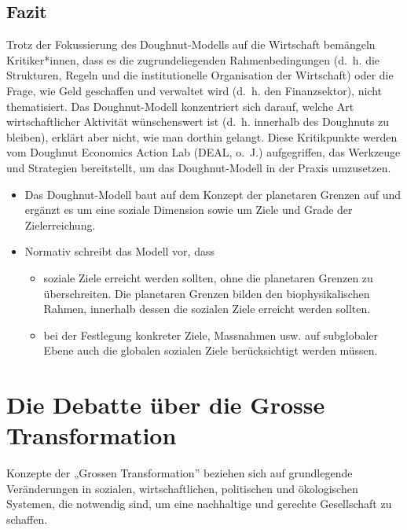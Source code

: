 \documentclass[
  nswissgerman,
  a4paper,
  DIV=11,
  numbers=noendperiod,
  oneside,
  openany]{scrreprt}
\begin{document}
\subsection{Fazit}\label{fazit-1}

Trotz der Fokussierung des Doughnut-Modells auf die Wirtschaft bemängeln
Kritiker*innen, dass es die zugrundeliegenden Rahmenbedingungen (d.~h.
die Strukturen, Regeln und die institutionelle Organisation der
Wirtschaft) oder die Frage, wie Geld geschaffen und verwaltet wird
(d.~h. den Finanzsektor), nicht thematisiert. Das Doughnut-Modell
konzentriert sich darauf, welche Art wirtschaftlicher Aktivität
wünschenswert ist (d.~h. innerhalb des Doughnuts zu bleiben), erklärt
aber nicht, wie man dorthin gelangt. Diese Kritikpunkte werden vom
Doughnut Economics Action Lab (DEAL, o.~J.) aufgegriffen, das Werkzeuge
und Strategien bereitstellt, um das Doughnut-Modell in der Praxis
umzusetzen.

\begin{itemize}
\item
  Das Doughnut-Modell baut auf dem Konzept der planetaren Grenzen auf
  und ergänzt es um eine soziale Dimension sowie um Ziele und Grade der
  Zielerreichung.
\item
  Normativ schreibt das Modell vor, dass

  \begin{itemize}
  \item
    soziale Ziele erreicht werden sollten, ohne die planetaren Grenzen
    zu überschreiten. Die planetaren Grenzen bilden den
    biophysikalischen Rahmen, innerhalb dessen die sozialen Ziele
    erreicht werden sollten.
  \item
    bei der Festlegung konkreter Ziele, Massnahmen usw. auf subglobaler
    Ebene auch die globalen sozialen Ziele berücksichtigt werden müssen.
  \end{itemize}
\end{itemize}

\section{Die Debatte über die Grosse
Transformation}\label{die-debatte-uxfcber-die-grosse-transformation}

Konzepte der „Grossen Transformation'' beziehen sich auf grundlegende
Veränderungen in sozialen, wirtschaftlichen, politischen und
ökologischen Systemen, die notwendig sind, um eine nachhaltige und
gerechte Gesellschaft zu schaffen.
\end{document}
